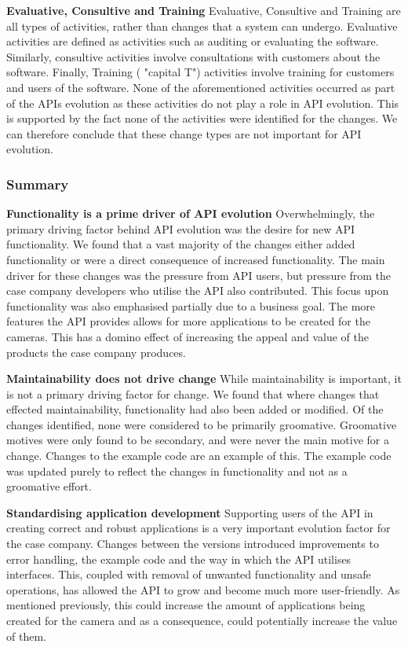 \documentclass{sig-alternate}
\begin{document}
\smallskip \noindent
\textbf{Evaluative, Consultive and Training  }
Evaluative, Consultive and Training are all types of activities, rather than changes that a system can undergo. Evaluative activities are defined as activities such as auditing or evaluating the software. Similarly, consultive activities involve consultations with customers about the software. Finally, Training ( "capital T") activities involve training for customers and users of the software.
None of the aforementioned activities occurred as part of the APIs evolution as these activities do not play a role in API evolution. This is supported by the fact none of the activities were identified for the changes.
We can therefore conclude that these change types are not important for API evolution.

\subsubsection{Summary}

\noindent
\textbf{Functionality is a prime driver of API evolution  }  
Overwhelmingly, the primary driving factor behind API evolution was the desire for new API functionality. We found that a vast majority of the changes either added functionality or were a direct consequence of increased functionality. The main driver for these changes was the pressure from API users, but pressure from the case company developers who utilise the API also contributed. This focus upon functionality was also emphasised partially due to a business goal. The more features the API provides allows for more applications to be created for the cameras. This has a domino effect of increasing the appeal and value of the products the case company produces.

\smallskip \noindent 
\textbf{Maintainability does not drive change  }  
While maintainability is important, it is not a primary driving factor for change. We found that where changes that effected maintainability, functionality had also been added or modified. Of the changes identified, none were considered to be primarily groomative. Groomative motives were only found to be secondary, and were never the main motive for a change. Changes to the example code are an example of this. The example code was updated purely to reflect the changes in functionality and not as a groomative effort. 

\smallskip \noindent
\textbf{Standardising application development  } 
Supporting users of the API in creating correct and robust applications is a very important evolution factor for the case company. Changes between the versions introduced improvements to error handling, the example code and the way in which the API utilises interfaces. This, coupled with removal of unwanted functionality and unsafe operations, has allowed the API to grow and become much more user-friendly. As mentioned previously, this could increase the amount of applications being created for the camera and as a consequence, could potentially increase the value of them.
\end{document}
